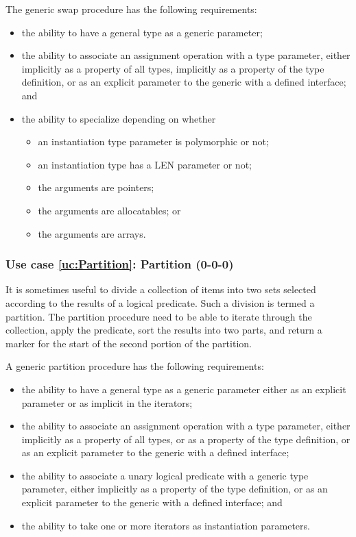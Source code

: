 \documentclass{article}
\newcounter{usecase}
\newcounter{requirement}
\newcommand{\newusecase}[2]{
\refstepcounter{usecase}\label{uc:#1}
\subsubsection{Use case \ref{uc:#1}: #1 (#2)}}
\begin{document}
The generic swap procedure has the following requirements:
\begin{itemize}
\item the ability to have a general type as a generic parameter;

\item the ability to associate an assignment operation with a type
  parameter, either implicitly as a property of all types, implicitly
  as a property of the type definition, or as an explicit parameter to
  the generic with a defined interface; and

\item the ability to specialize depending on whether
  \begin{itemize}
    \item an instantiation type parameter is polymorphic or not;
    \item an instantiation type has a LEN parameter or not;
    \item the arguments are pointers;
    \item the arguments are allocatables; or
    \item the  arguments are arrays.
  \end{itemize}

\end{itemize}

\newusecase{Partition}{0-0-0}
It is sometimes useful to divide a collection of items into two sets
selected according to the results of a logical predicate.  Such a
division is termed a partition. The partition procedure need to be
able to iterate through the collection, apply the predicate, sort the
results into two parts, and return a marker for the start of the
second   portion of the partition.

A generic partition procedure has the following requirements:
\begin{itemize}
\item the ability to have a general type as a generic parameter
  either as an explicit parameter or as implicit in the  iterators;

\item the ability to associate an assignment operation with a type
  parameter, either implicitly as a property of all types, or
  as a property of the type definition, or as an explicit parameter to
  the generic with a defined interface;

\item the ability to associate a unary logical predicate with a
  generic type parameter, either implicitly
  as a property of the type definition, or as an explicit parameter to
  the generic with a defined interface; and

\item the ability to take one or more iterators as instantiation
  parameters.

\end{itemize}
\end{document}
